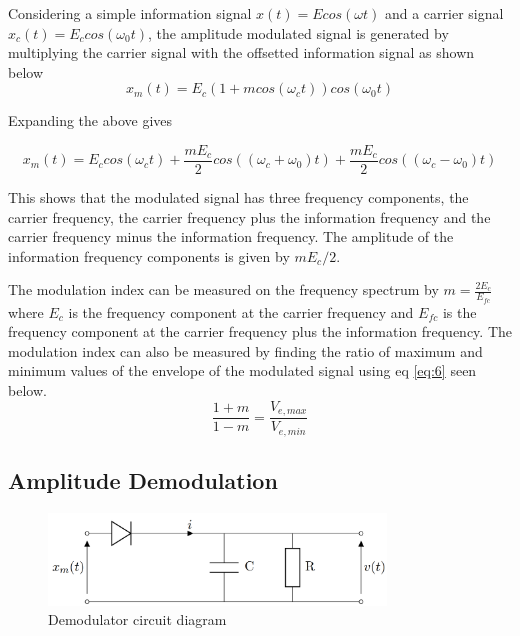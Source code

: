 \documentclass[12pt]{article}
\begin{document}
Considering a simple information signal $x(t) = E cos(\omega t)$ and a carrier signal $x_c(t) = E_c cos(\omega_0 t)$, the amplitude modulated signal is generated by multiplying the carrier signal with the offsetted information signal as shown below
\begin{equation}
    x_m(t) = E_c(1+m cos(\omega_ct))cos(\omega_0t)
    \label{eq:4}
\end{equation}

Expanding the above gives

\begin{equation}
    x_m(t) = E_c cos(\omega_c t) + \frac{m E_c}{2}cos((\omega_c + \omega_0)t) + \frac{m E_c}{2}cos((\omega_c - \omega_0)t)
    \label{eq:5}
\end{equation}

This shows that the modulated signal has three frequency components, the carrier frequency, the carrier frequency plus the information frequency and the carrier frequency minus the information frequency. The amplitude of the information frequency components is given by $mE_c/2$.

The modulation index can be measured on the frequency spectrum by $m = \frac{2E_c}{E_{fc}} $ where $E_c$ is the frequency component at the carrier frequency and $E_{fc}$ is the frequency component at the carrier frequency plus the information frequency.
The modulation index can also be measured by finding the ratio of maximum and minimum values of the envelope of the modulated signal using eq \ref{eq:6} seen below.
\begin{equation}
    \frac{1+m}{1-m} = \frac{V_{e,max}}{V_{e,min}}
    \label{eq:6}
\end{equation}

\subsection{Amplitude Demodulation}

\begin{figure}[h]
    \centering
    \includegraphics[width=0.8\textwidth]{demod_circuit.png}
    \caption{Demodulator circuit diagram}
    \label{fig:demod_circuit}
\end{figure}
\end{document}
